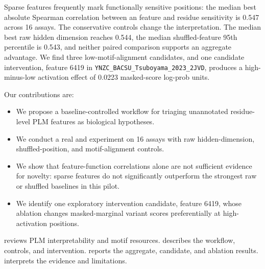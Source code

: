  Sparse features frequently mark functionally sensitive positions: the median best absolute Spearman correlation between an \sae feature and \dms residue sensitivity is 0.547 across 16 assays. The conservative controls change the interpretation. The median best raw hidden dimension reaches 0.544, the median shuffled-feature 95th percentile is 0.543, and neither paired comparison supports an aggregate \sae advantage. We find three low-motif-alignment candidates, and one candidate intervention, feature 6419 in \texttt{YNZC\_BACSU\_Tsuboyama\_2023\_2JVD}, produces a high-minus-low activation effect of 0.0223 masked-score log-prob units.

Our contributions are:
\begin{itemize}
\setlength{\itemsep}{0pt}
\setlength{\topsep}{0pt}
    \item We propose a baseline-controlled workflow for triaging unannotated residue-level PLM features as biological hypotheses.
    \item We conduct a real \esmeight and \interplm experiment on 16 \proteingym assays with raw hidden-dimension, shuffled-position, and motif-alignment controls.
    \item We show that feature-function correlations alone are not sufficient evidence for novelty: sparse features do not significantly outperform the strongest raw or shuffled baselines in this pilot.
    \item We identify one exploratory intervention candidate, \interplm feature 6419, whose ablation changes masked-marginal variant scores preferentially at high-activation positions.
\end{itemize}

 reviews PLM interpretability and motif resources.  describes the workflow, controls, and intervention.  reports the aggregate, candidate, and ablation results.  interprets the evidence and limitations.
